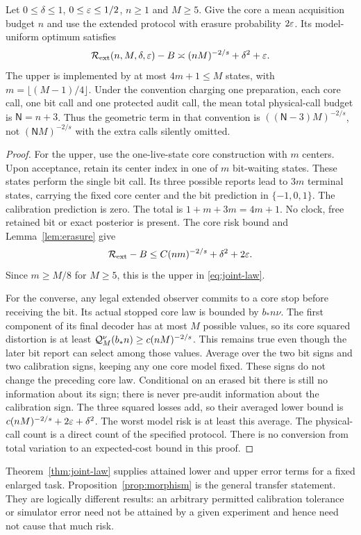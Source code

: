 \begin{theorem}\label{thm:joint-law}
Let $0\le\delta\le1$, $0\le\varepsilon\le1/2$, $n\ge1$ and $M\ge5$. Give the core a mean acquisition budget $n$ and use the extended protocol with erasure probability $2\varepsilon$. Its model-uniform optimum satisfies
\begin{equation}\label{eq:joint-law}
 \mathcal R_{\rm ext}(n,M,\delta,\varepsilon)-B
        \asymp (nM)^{-2/s}+\delta^2+\varepsilon.
\end{equation}
The upper is implemented by at most $4m+1\le M$ states, with $m=\lfloor(M-1)/4\rfloor$. Under the convention charging one preparation, each core call, one bit call and one protected audit call, the mean total physical-call budget is $\mathsf N=n+3$. Thus the geometric term in that convention is $((\mathsf N-3)M)^{-2/s}$, not $(\mathsf NM)^{-2/s}$ with the extra calls silently omitted.
\end{theorem}
\begin{proof}
For the upper, use the one-live-state core construction with $m$ centers. Upon acceptance, retain its center index in one of $m$ bit-waiting states. These states perform the single bit call. Its three possible reports lead to $3m$ terminal states, carrying the fixed core center and the bit prediction in $\{-1,0,1\}$. The calibration prediction is zero. The total is $1+m+3m=4m+1$. No clock, free retained bit or exact posterior is present. The core risk bound and Lemma~\ref{lem:erasure} give
\[
 \mathcal R_{\rm ext}-B\le C(nm)^{-2/s}+\delta^2+2\varepsilon.
\]
Since $m\ge M/8$ for $M\ge5$, this is the upper in \eqref{eq:joint-law}.

For the converse, any legal extended observer commits to a core stop before receiving the bit. Its actual stopped core law is bounded by $b_*n\nu$. The first component of its final decoder has at most $M$ possible values, so its core squared distortion is at least $\mathcal Q_M^\nu(b_*n)\ge c(nM)^{-2/s}$. This remains true even though the later bit report can select among those values. Average over the two bit signs and two calibration signs, keeping any one core model fixed. These signs do not change the preceding core law. Conditional on an erased bit there is still no information about its sign; there is never pre-audit information about the calibration sign. The three squared losses add, so their averaged lower bound is $c(nM)^{-2/s}+2\varepsilon+\delta^2$. The worst model risk is at least this average. The physical-call count is a direct count of the specified protocol. There is no conversion from total variation to an expected-cost bound in this proof.
\end{proof}

Theorem~\ref{thm:joint-law} supplies attained lower and upper error terms for a fixed enlarged task. Proposition~\ref{prop:morphism} is the general transfer statement. They are logically different results: an arbitrary permitted calibration tolerance or simulator error need not be attained by a given experiment and hence need not cause that much risk.
